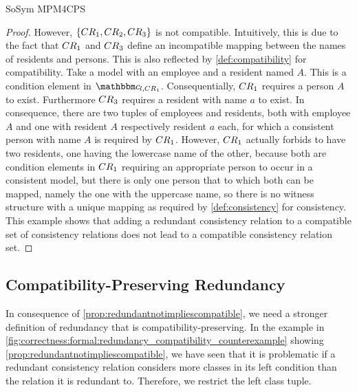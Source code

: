 \begin{copiedFrom}{SoSym MPM4CPS}
\begin{proof}
However, $\{ CR_{1}, CR_{2}, CR_{3} \}$ is not compatible.
Intuitively, this is due to the fact that $CR_{1}$ and $CR_{3}$ define an incompatible mapping between the names of residents and persons.
This is also reflected by \autoref{def:compatibility} for compatibility. Take a model with an employee and a resident named $A$. This is a condition element in $\condition{c}{l,\consistencyrelation{CR}{1}}$. 
Consequentially, $CR_{1}$ requires a person $A$ to exist. Furthermore $CR_{3}$ requires a resident with name $a$ to exist.
In consequence, there are two tuples of employees and residents, both with employee $A$ and one with resident $A$ respectively resident $a$ each, for which a consistent person with name $A$ is required by $CR_{1}$.
However, $CR_{1}$ actually forbids to have two residents, one having the lowercase name of the other, because both are condition elements in $CR_{1}$ requiring an appropriate person to occur in a consistent model, but there is only one person that to which both can be mapped, namely the one with the uppercase name, so there is no witness structure with a unique mapping as required by \autoref{def:consistency} for consistency.
This example shows that adding a redundant consistency relation to a compatible set of consistency relations does not lead to a compatible consistency relation set.
\end{proof}



\subsection{Compatibility-Preserving Redundancy}

In consequence of \autoref{prop:redundantnotimpliescompatible}, we need a stronger definition of redundancy that is compatibility-preserving. 
In the example in \autoref{fig:correctness:formal:redundancy_compatibility_counterexample} showing \autoref{prop:redundantnotimpliescompatible}, we have seen that it is problematic if a redundant consistency relation considers more classes in its left condition than the relation it is redundant to.
Therefore, we restrict the left class tuple.


\end{copiedFrom}
